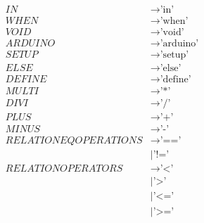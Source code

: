 \begin{align*}
    IN                      & \to \text{'in'}                                                                       \\
    WHEN                    & \to \text{'when'}                                                                     \\
    VOID                    & \to \text{'void'}                                                                     \\
    ARDUINO                 & \to \text{'arduino'}                                                                  \\
    SETUP                   & \to \text{'setup'}                                                                    \\
    ELSE                    & \to \text{'else'}                                                                     \\
    DEFINE                  & \to \text{'define'}                                                                   \\
    MULTI                   & \to \text{'*'}                                                                        \\
    DIVI                    & \to \text{'/'}                                                                        \\
    PLUS                    & \to \text{'+'}                                                                        \\
    MINUS                   & \to \text{'-'}                                                                        \\
    RELATIONEQOPERATIONS    & \to \text{'=='}                                                                       \\
                            & \mid \text{'!='}                                                                      \\
    RELATIONOPERATORS       & \to \text{'<'}                                                                        \\
                            & \mid \text{'>'}                                                                       \\
                            & \mid \text{'<='}                                                                      \\
                            & \mid \text{'>='}                                                                      \\

\end{align*}
